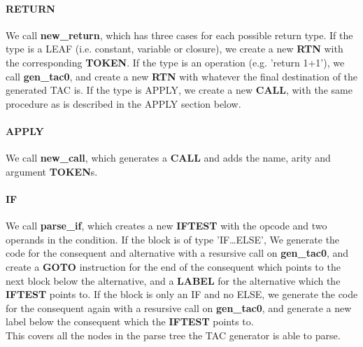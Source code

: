 \documentclass[12pt]{article}
\begin{document}
\paragraph{RETURN} We call \textbf{new\_return}, which has three cases for each possible return type. If the type is a LEAF (i.e. constant, variable or closure), we create a new \textbf{RTN} with the corresponding \textbf{TOKEN}. If the type is an operation (e.g. 'return 1+1'), we call \textbf{gen\_tac0}, and create a new \textbf{RTN} with whatever the final destination of the generated TAC is. If the type is APPLY, we create a new \textbf{CALL}, with the same procedure as is described in the APPLY section below. 
\paragraph{APPLY} We call \textbf{new\_call}, which generates a \textbf{CALL} and adds the name, arity and argument \textbf{TOKEN}s. 
\paragraph{IF} We call \textbf{parse\_if}, which creates a new \textbf{IFTEST} with the opcode and two operands in the condition. If the block is of type 'IF\dots ELSE', We generate the code for the consequent and alternative with a resursive call on \textbf{gen\_tac0}, and create a \textbf{GOTO} instruction for the end of the consequent which points to the next block below the alternative, and a \textbf{LABEL} for the alternative which the \textbf{IFTEST} points to. If the block is only an IF and no ELSE, we generate the code for the consequent again with a resursive call on \textbf{gen\_tac0}, and generate a new label below the consequent which the \textbf{IFTEST} points to. 
\\\newline This covers all the nodes in the parse tree the TAC generator is able to parse. 
\end{document}
